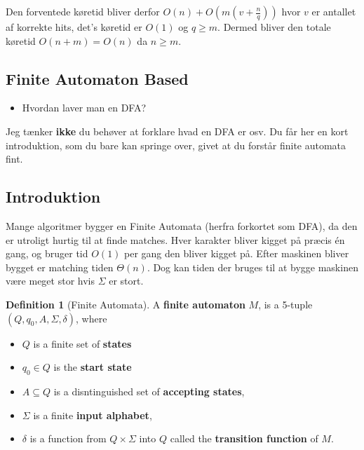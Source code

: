 \documentclass[11pt]{article}
\theoremstyle{definition}
\newtheorem{definition}{Definition}
\theoremstyle{remark}
\begin{document}
Den forventede køretid bliver derfor $O(n) + O(m(v + \frac{n}{q}))$ hvor $v$ er antallet af korrekte hits, det's køretid er $O(1)$ og $q \geq m$. Dermed bliver den totale køretid $O(n+m) = O(n)$ da $n \geq m$.



\subsection{Finite Automaton Based}
\label{subsec:DFA}

\begin{itemize}
\item Hvordan laver man en DFA?
\end{itemize}

Jeg tænker \textbf{ikke} du behøver at forklare hvad en DFA er osv. Du får her en kort introduktion, som du bare kan springe over, givet at du forstår finite automata fint.

\subsection{Introduktion}
\label{subsec:DFAIntro}

Mange algoritmer bygger en Finite Automata (herfra forkortet som DFA), da den er utroligt hurtig til at finde matches. Hver karakter bliver kigget på præcis én gang, og bruger tid $O(1)$ per gang den bliver kigget på. Efter maskinen bliver bygget er matching tiden $\Theta(n)$. Dog kan tiden der bruges til at bygge maskinen være meget stor hvis $\Sigma$ er stort. 

\begin{definition}[Finite Automata]
  A \textbf{finite automaton} $M$, is a 5-tuple $(Q, q_{0}, A, \Sigma, \delta)$, where

  \begin{itemize}
  \item $Q$ is a finite set of \textbf{states}
  \item $q_{0} \in Q$ is the \textbf{start state}
  \item $A \subseteq Q$ is a disntinguished set of \textbf{accepting states},
  \item $\Sigma$ is a finite \textbf{input alphabet}, 
  \item $\delta$ is a function from $Q \times \Sigma$ into $Q$ called the \textbf{transition function} of  $M$.
  \end{itemize}
\end{definition}
\end{document}
